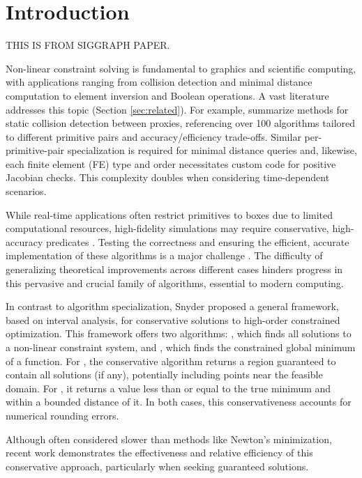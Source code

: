 
\section{Introduction}
\label{sec:introduction}

THIS IS FROM SIGGRAPH PAPER.

Non-linear constraint solving is fundamental to graphics and scientific computing, with applications ranging from collision detection and minimal distance computation to element inversion and Boolean operations. A vast literature addresses this topic (Section \ref{sec:related}). For example, \cite{RTR4,Akenine2024} summarize methods for static collision detection between proxies, referencing over 100 algorithms tailored to different primitive pairs and accuracy/efficiency trade-offs.
Similar per-primitive-pair specialization is required for minimal distance queries and, likewise, each finite element (FE) type and order necessitates custom code for positive Jacobian checks.
This complexity doubles when considering time-dependent scenarios.

While real-time applications often restrict primitives to boxes due to limited computational resources, high-fidelity simulations may require conservative, high-accuracy predicates \cite{snyder92}.
Testing the correctness and ensuring the efficient, accurate implementation of these algorithms is a major challenge \cite{Wang2021}. The difficulty of generalizing theoretical improvements across different cases hinders progress in this pervasive and crucial family of algorithms, essential to modern computing.

In contrast to algorithm specialization, Snyder \cite{snyder92} proposed a general framework, based on interval analysis, for conservative solutions to high-order constrained optimization. This framework offers two algorithms: \solve, which finds all solutions to a non-linear constraint system, and \minimize, which finds the constrained global minimum of a function. For \solve, the conservative algorithm returns a region guaranteed to contain all solutions (if any), potentially including points near the feasible domain. For \minimize, it returns a value less than or equal to the true minimum and within a bounded distance of it. In both cases, this conservativeness accounts for numerical rounding errors.

Although often considered slower than methods like Newton's minimization, recent work \cite{Wang2021,Chen2024} 
 demonstrates the effectiveness and relative efficiency of this conservative approach, particularly when seeking guaranteed solutions. 

